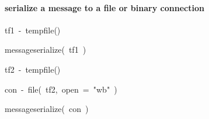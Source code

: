 \documentclass[10pt,twocolumn,a4paper]{article}
\newenvironment{Hinput}%
{}%
{}%
\newenvironment{Hchunk}%
{\vspace{0.5em}\par\begin{flushleft}}%
{\end{flushleft}}%
\newcommand{\hlfunctioncall}[1]{\textcolor[rgb]{1,0,0}{#1}}%
\newcommand{\hlstring}[1]{\textcolor[rgb]{0.6,0.6,1}{#1}}%
\newcommand{\hlkeyword}[1]{\textcolor[rgb]{0,0,0}{#1}}%
\newcommand{\hlargument}[1]{\textcolor[rgb]{0.694117647058824,0.247058823529412,0.0196078431372549}{#1}}%
\newcommand{\hlassignement}[1]{\textcolor[rgb]{0.215686274509804,0.215686274509804,0.384313725490196}{#1}}%
\newcommand{\hlsymbol}[1]{\textcolor[rgb]{0,0,0}{#1}}%
\newcommand{\hlprompt}[1]{\textcolor[rgb]{0,0,0}{#1}}%
\begin{document}
\paragraph{serialize a message to a file or binary connection}

\begin{Hchunk}
\begin{normalsize}
\begin{Hinput}

\ttfamily\noindent
\hlprompt{\usebox{\hlnormalsizeboxgreaterthan}{\ }}\hlsymbol{tf1}{\ }\hlassignement{\usebox{\hlnormalsizeboxlessthan}-}{\ }\hlfunctioncall{tempfile}\hlkeyword{(}\hlkeyword{)}\mbox{}
\normalfont

\end{Hinput}


\begin{Hinput}

\ttfamily\noindent
\hlprompt{\usebox{\hlnormalsizeboxgreaterthan}{\ }}\hlsymbol{message}\hlkeyword{\usebox{\hlnormalsizeboxdollar}}\hlfunctioncall{serialize}\hlkeyword{(}{\ }\hlsymbol{tf1}{\ }\hlkeyword{)}\mbox{}
\normalfont

\end{Hinput}


\begin{Hinput}

\ttfamily\noindent
\hlprompt{\usebox{\hlnormalsizeboxgreaterthan}{\ }}\hlsymbol{tf2}{\ }\hlassignement{\usebox{\hlnormalsizeboxlessthan}-}{\ }\hlfunctioncall{tempfile}\hlkeyword{(}\hlkeyword{)}\mbox{}
\normalfont

\end{Hinput}


\begin{Hinput}

\ttfamily\noindent
\hlprompt{\usebox{\hlnormalsizeboxgreaterthan}{\ }}\hlsymbol{con}{\ }\hlassignement{\usebox{\hlnormalsizeboxlessthan}-}{\ }\hlfunctioncall{file}\hlkeyword{(}{\ }\hlsymbol{tf2}\hlkeyword{,}{\ }\hlargument{open}{\ }\hlargument{=}{\ }\hlstring{"{}wb"{}}{\ }\hlkeyword{)}\mbox{}
\normalfont

\end{Hinput}


\begin{Hinput}

\ttfamily\noindent
\hlprompt{\usebox{\hlnormalsizeboxgreaterthan}{\ }}\hlsymbol{message}\hlkeyword{\usebox{\hlnormalsizeboxdollar}}\hlfunctioncall{serialize}\hlkeyword{(}{\ }\hlsymbol{con}{\ }\hlkeyword{)}\mbox{}
\normalfont


\end{Hinput}
\end{normalsize}
\end{Hchunk}
\end{document}
